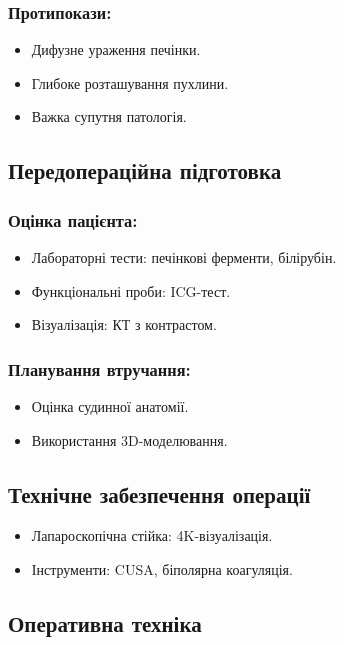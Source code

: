 \begin{refsection}
\subsubsection{Протипокази:}
\begin{itemize}
    \item Дифузне ураження печінки.
    \item Глибоке розташування пухлини.
    \item Важка супутня патологія.
\end{itemize}

\subsection{Передопераційна підготовка}
\subsubsection{Оцінка пацієнта:}
\begin{itemize}
    \item Лабораторні тести: печінкові ферменти, білірубін.
    \item Функціональні проби: ICG-тест.
    \item Візуалізація: КТ з контрастом.
\end{itemize}

\subsubsection{Планування втручання:}
\begin{itemize}
    \item Оцінка судинної анатомії.
    \item Використання 3D-моделювання.
\end{itemize}

\subsection{Технічне забезпечення операції}
\begin{itemize}
    \item Лапароскопічна стійка: 4K-візуалізація.
    \item Інструменти: CUSA, біполярна коагуляція.
\end{itemize}

\subsection{Оперативна техніка}

\end{refsection}
